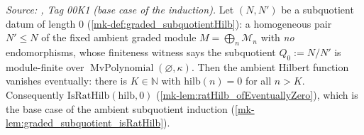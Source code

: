 \begin{lemma}\label{mk-lem:graded_subquotient_base_eventuallyZero}
  \leanok

  \textit{Source: \cite{stacks-project}, Tag 00K1 (base case of the induction).}
  Let \((N, N')\) be a subquotient datum of length \(0\)
  (\ref{mk-def:graded_subquotientHilb}): a homogeneous pair \(N' \le N\) of the fixed
  ambient graded module \(M = \bigoplus_n \mathcal{M}_n\) with \emph{no} endomorphisms,
  whose finiteness witness says the subquotient \(Q_0 := N/N'\) is module-finite over
  \(\operatorname{MvPolynomial}(\varnothing, \kappa)\). Then the ambient Hilbert
  function vanishes eventually: there is \(K \in \mathbb{N}\) with
  \(\mathrm{hilb}(n) = 0\) for all \(n > K\). Consequently
  \(\mathrm{IsRatHilb}(\mathrm{hilb}, 0)\) (\ref{mk-lem:ratHilb_ofEventuallyZero}),
  which is the base case of the ambient subquotient induction
  (\ref{mk-lem:graded_subquotient_isRatHilb}).
\end{lemma}


